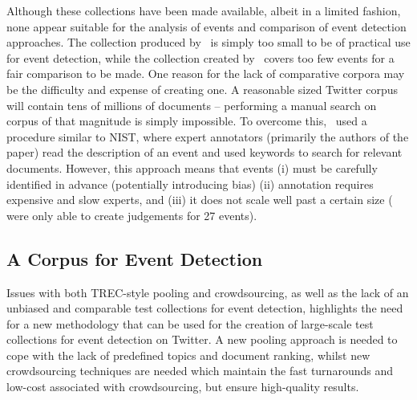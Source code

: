 Although these collections have been made available, albeit in a limited fashion, none appear suitable for the analysis of events and comparison of event detection approaches.
The collection produced by~\citeauthor{Becker:2012:ICP:2124295.2124360} is simply too small to be of practical use for event detection, while the collection created by~\citeauthor{Petrovic:2012:UPI:2382029.2382072} covers too few events for a fair comparison to be made.
One reason for the lack of comparative corpora may be the difficulty and expense of creating one.
A reasonable sized Twitter corpus will contain tens of millions of documents -- performing a manual search on corpus of that magnitude is simply impossible.
To overcome this,~\citeauthor{Petrovic:2012:UPI:2382029.2382072} used a procedure similar to NIST, where expert annotators (primarily the authors of the paper) read the description of an event and used keywords to search for relevant documents.
However, this approach means that events (i) must be carefully identified in advance (potentially introducing bias) (ii) annotation requires expensive and slow experts, and (iii) it does not scale well past a certain size (\citeauthor{Petrovic:2012:UPI:2382029.2382072} were only able to create judgements for 27 events).

\subsection{A Corpus for Event Detection}
Issues with both TREC-style pooling and crowdsourcing, as well as the lack of an unbiased and comparable test collections for event detection, highlights the need for a new methodology that can be used for the creation of large-scale test collections for event detection on Twitter.
A new pooling approach is needed to cope with the lack of predefined topics and document ranking, whilst new crowdsourcing techniques are needed which maintain the fast turnarounds and low-cost associated with crowdsourcing, but ensure high-quality results.

